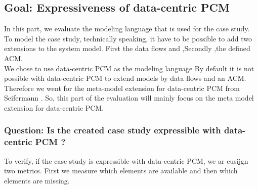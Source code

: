 \subsection{Goal: Expressiveness of data-centric PCM}
In this part, we evaluate the modeling language that is used for the case study. To model the case study, technically speaking, it have to be possible to add two extensions to the system model. First the data flows and ,Secondly ,the defined ACM.\\ We chose to use data-centric PCM as the modeling language %
By default it is not possible with data-centric PCM to extend models by data flows and an ACM. Therefore we went for the meta-model extension for data-centric PCM from Seifermann \cite{MMextension}. So, this part of the evaluation will mainly focus on the meta model extension for data-centric PCM. 

\subsubsection{Question: Is the created case study expressible with data-centric PCM ?}
To verify, if the case study is expressible with data-centric PCM, we ar eusijgn two metrics. First we measure which elements are available and then which elements are missing.
